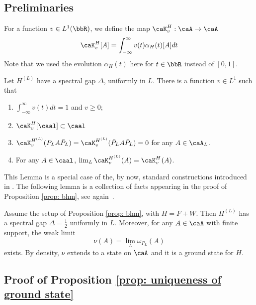 \subsection{Preliminaries}


For a function $v \in L^1(\bbR)$,
we define the map $\caK^H_v: \caA\to\caA$
\begin{equation*}
	\caK^{H}_v[A] = \int_{-\infty}^\infty  v(t)\alpha_H(t)[A]dt
\end{equation*}
Note that we used the evolution $\alpha_H(t)$ here for $t\in \bbR$ instead of $[0,1]$.
\begin{lemma}\label{lem: Block diagonalization} 
	Let $H^{(L)}$ have a spectral gap $\Delta$, uniformly in $L$.  There is a function $v\in L^1$ such that 
	\begin{enumerate}
		\item $\int_{-\infty}^{\infty} v(t) dt=1$ and $v\geq 0$;
		\item  $\caK^{H}_v[\caal]\subset \caal$
		\item $\caK^{H^{(L)}}_v(P_LA\bar{P}_L)=\caK^{H^{(L)}}_v(\bar{P}_LA\bar{P}_L)=0$ for any $A\in \caA_L$.
		\item For any $A\in \caal$,  $\lim_L\caK^{H^{(L)}}_v(A)= \caK^{H^{}}_v(A)$.
	\end{enumerate}
\end{lemma}
This Lemma is a special case of the,  by now, standard constructions introduced in \cite{hastings2005quasiadiabatic,bachmann2012automorphic}. The following lemma is a collection of facts appearing in the proof of Proposition \ref{prop: bhm}, see again~\cite{nachtergaele2020quasi}.
\begin{lemma}\label{lem: limiting ground state} 
	Assume the setup of Proposition \ref{prop: bhm}, with $H=F+W$. Then $H^{(L)}$ has a spectral gap $\Delta=\tfrac{1}{2}$ uniformly in $L$.  Moreover, 
	for any $A\in \caA$ with finite support, the weak limit
	$$
	\nu(A)=\lim_L \omega_{P_L}(A)
	$$
	exists. By density, $\nu$ extends to a state on $\caA$ and it is a ground state for $H$.
\end{lemma}


\subsection{Proof of Proposition \ref{prop: uniqueness of ground state}}

